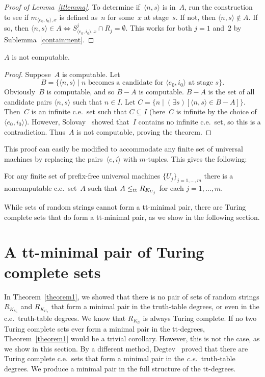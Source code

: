 \documentclass{LMCS}
\newcommand{\0}{\mathbf{0}}
\newcommand{\lett}{\leq_{\rm {tt}}}
\newcommand{\es}{\emptyset}
\newcommand{\ce}{c.e.\ }
\newcommand{\RKUj}{R_j}
\newcommand{\ei}{{\langle e,i\rangle}}
\newcommand{\eizero}{{\langle e_0,i_0\rangle}}
\newcommand{\ns}{{\langle n,s\rangle}}
\newcommand{\meizerox}{{m_{\eizero,x}}}
\newcommand{\<}{\langle}
\renewcommand{\>}{\rangle}
\begin{document}
\begin{proof}[Proof of Lemma~\ref{ttlemma}]
To determine if~$\ns$ is in~$A$, run the construction to see if $\meizerox$
is defined as~$n$ for some~$x$ at stage~$s$.  If not, then $\ns\notin A$.  If
so, then $\ns\in A\iff S^j_{\eizero,x}\cap \RKUj=\es$.  This works for both
$j=1$ and~$2$ by Sublemma~\ref{containment}.
\end{proof}

\begin{lem} $A$ is not computable.
\end{lem}

\begin{proof}
Suppose~$A$ is computable.  Let
$$
B=\{\ns \mid \text{$n$ becomes a candidate for $\eizero$ at stage~$s$}\}.
$$
Obviously~$B$ is computable, and so $B-A$ is computable. $B-A$ is the set of
all candidate pairs $\ns$ such that $n\in I$. Let $C=\{n \mid (\exists s)[\ns
\in B- A]\}$. Then~$C$ is an infinite \ce set such that $C\subseteq I$
(here~$C$ is infinite by the choice of $\eizero$). However,
Solovay~\cite{Solovay} showed that~$I$ contains no infinite \ce set, so this
is a contradiction. Thus~$A$ is not computable, proving the theorem.
\end{proof}

This proof can easily be modified to accommodate any finite set of universal
machines by replacing the pairs~$\ei$ with $m$-tuples.  This gives the
following:

\begin{thm}\label{thmfinite}
For any finite set of prefix-free universal machines $\{U_j\}_{j=1,\ldots,m}$
there is a noncomputable \ce set~$A$ such that $A\lett R_{K_{U_j}}$ for each
$j=1,\ldots, m$.
\end{thm}

While sets of random strings cannot form a tt-minimal pair, there are Turing
complete sets that do form a tt-minimal pair, as we show in the following
section.

\section{A tt-minimal pair of Turing complete sets}\label{minpair}

In Theorem~\ref{theorem1}, we showed that there is no pair of sets of random
strings $R_{K_{U_1}}$ and $R_{K_{U_2}}$ that form a minimal pair in the
truth-table degrees, or even in the \ce truth-table degrees. We know that
$R_{K_U}$ is always Turing complete. If no two Turing complete sets ever form
a minimal pair in the tt-degrees, Theorem~\ref{theorem1} would be a trivial
corollary. However, this is not the case, as we show in this section. By a
different method, Degtev~\cite{Degtev} proved that there are Turing complete
\ce sets that form a minimal pair in the \emph{c.e.\ }truth-table degrees. We
produce a minimal pair in the full structure of the tt-degrees.
\end{document}
